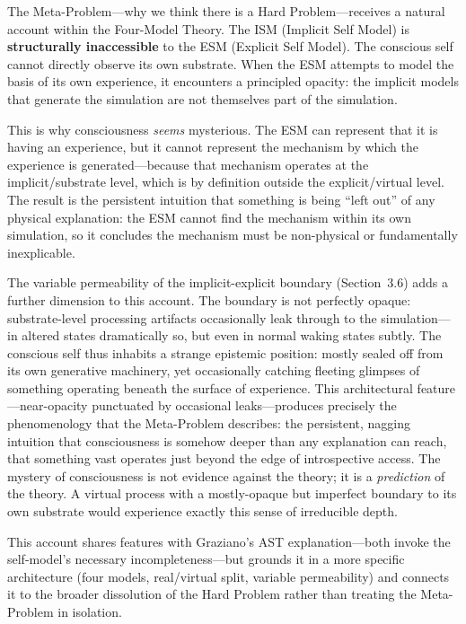 \documentclass[12pt]{article}
\begin{document}
The Meta-Problem---\hspace{0pt}why we think there is a Hard Problem---\hspace{0pt}receives a natural account within the Four-Model Theory. The ISM (Implicit Self Model) is \textbf{structurally inaccessible} to the ESM (Explicit Self Model). The conscious self cannot directly observe its own substrate. When the ESM attempts to model the basis of its own experience, it encounters a principled opacity: the implicit models that generate the simulation are not themselves part of the simulation.

This is why consciousness \emph{seems} mysterious. The ESM can represent that it is having an experience, but it cannot represent the mechanism by which the experience is generated---\hspace{0pt}because that mechanism operates at the implicit/substrate level, which is by definition outside the explicit/virtual level. The result is the persistent intuition that something is being ``left out'' of any physical explanation: the ESM cannot find the mechanism within its own simulation, so it concludes the mechanism must be non-physical or fundamentally inexplicable.

The variable permeability of the implicit-explicit boundary (Section~3.6) adds a further dimension to this account. The boundary is not perfectly opaque: substrate-level processing artifacts occasionally leak through to the simulation---\hspace{0pt}in altered states dramatically so, but even in normal waking states subtly. The conscious self thus inhabits a strange epistemic position: mostly sealed off from its own generative machinery, yet occasionally catching fleeting glimpses of something operating beneath the surface of experience. This architectural feature---\hspace{0pt}near-opacity punctuated by occasional leaks---\hspace{0pt}produces precisely the phenomenology that the Meta-Problem describes: the persistent, nagging intuition that consciousness is somehow deeper than any explanation can reach, that something vast operates just beyond the edge of introspective access. The mystery of consciousness is not evidence against the theory; it is a \emph{prediction} of the theory. A virtual process with a mostly-opaque but imperfect boundary to its own substrate would experience exactly this sense of irreducible depth.

This account shares features with Graziano's AST explanation---\hspace{0pt}both invoke the self-model's necessary incompleteness---\hspace{0pt}but grounds it in a more specific architecture (four models, real/virtual split, variable permeability) and connects it to the broader dissolution of the Hard Problem rather than treating the Meta-Problem in isolation.
\end{document}
